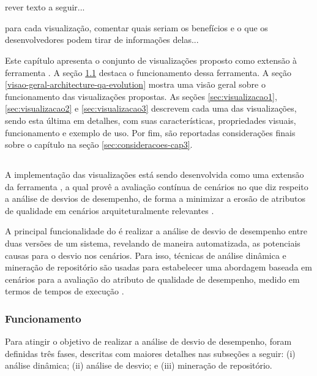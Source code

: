 \chapter{\toolName} \label{ch:pqae}

{\color{red}rever texto a seguir...}

{\color{red}para cada visualização, comentar quais seriam os benefícios e o que os desenvolvedores podem tirar de informações delas...}

Este capítulo apresenta o conjunto de visualizações proposto como extensão à ferramenta \textit{\perfMinerName}. A seção \ref{sec:perfminer} destaca o funcionamento dessa ferramenta. A seção \ref{visao-geral-architecture-qa-evolution} mostra uma visão geral sobre o funcionamento das visualizações propostas. As seções \ref{sec:visualizacao1}, \ref{sec:visualizacao2} e \ref{sec:visualizacao3} descrevem cada uma das visualizações, sendo esta última em detalhes, com suas características, propriedades visuais, funcionamento e exemplo de uso. Por fim, são reportadas considerações finais sobre o capítulo na seção \ref{sec:consideracoes-cap3}.

\section{\perfMinerName} \label{sec:perfminer}

A implementação das visualizações está sendo desenvolvida como uma extensão da ferramenta \textit{\perfMinerName}, a qual provê a avaliação contínua de cenários no que diz respeito a análise de desvios de desempenho, de forma a minimizar a erosão de atributos de qualidade em cenários arquiteturalmente relevantes \cite{Pinto2015}.

A principal funcionalidade do \textit{\perfMinerName} é realizar a análise de desvio de desempenho entre duas versões de um sistema, revelando de maneira automatizada, as potenciais causas para o desvio nos cenários. Para isso, técnicas de análise dinâmica e mineração de repositório são usadas para estabelecer uma abordagem baseada em cenários para a avaliação do atributo de qualidade de desempenho, medido em termos de tempos de execução \cite{Pinto2015}.

\subsection{Funcionamento} \label{subsec:funcionamento-perfminer}

Para atingir o objetivo de realizar a análise de desvio de desempenho, foram definidas três fases, descritas com maiores detalhes nas subseções a seguir: (i) análise dinâmica; (ii) análise de desvio; e (iii) mineração de repositório.

